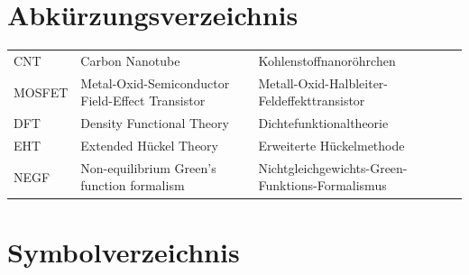 %
%
%


\chapter*{Abkürzungsverzeichnis}
\def\listacronymname{Abkürzungsverzeichnis}


\begin{tabularx}{\linewidth}{YYY}
CNT & Carbon Nanotube & Kohlenstoffnanoröhrchen\\
MOSFET & Metal-Oxid-Semiconductor Field-Effect Transistor & Metall-Oxid-Halbleiter-Feldeffekttransistor\\
DFT & Density Functional Theory & Dichtefunktionaltheorie\\
EHT & Extended Hückel Theory & Erweiterte Hückelmethode\\
NEGF & Non-equilibrium Green's function formalism & Nichtgleichgewichts-Green-Funktions-Formalismus\\

\end{tabularx}

%
%


\chapter*{Symbolverzeichnis}
\def\listacronymname{Symbolverzeichnis}

